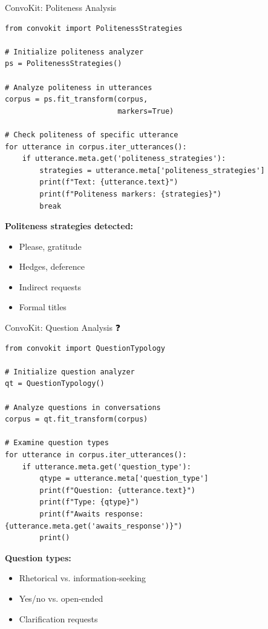 \documentclass[aspectratio=169]{beamer}
\begin{document}
\begin{frame}[fragile]{ConvoKit: Politeness Analysis 🎩}
    \begin{lstlisting}
from convokit import PolitenessStrategies

# Initialize politeness analyzer
ps = PolitenessStrategies()

# Analyze politeness in utterances
corpus = ps.fit_transform(corpus,
                          markers=True)

# Check politeness of specific utterance
for utterance in corpus.iter_utterances():
    if utterance.meta.get('politeness_strategies'):
        strategies = utterance.meta['politeness_strategies']
        print(f"Text: {utterance.text}")
        print(f"Politeness markers: {strategies}")
        break
    \end{lstlisting}

    \vspace{0.3cm}

    \textbf{Politeness strategies detected:}
    \begin{itemize}\setlength{\itemsep}{0pt}
        \item Please, gratitude
        \item Hedges, deference
        \item Indirect requests
        \item Formal titles
    \end{itemize}
\end{frame}

\begin{frame}[fragile]{ConvoKit: Question Analysis ❓}
    \begin{lstlisting}
from convokit import QuestionTypology

# Initialize question analyzer
qt = QuestionTypology()

# Analyze questions in conversations
corpus = qt.fit_transform(corpus)

# Examine question types
for utterance in corpus.iter_utterances():
    if utterance.meta.get('question_type'):
        qtype = utterance.meta['question_type']
        print(f"Question: {utterance.text}")
        print(f"Type: {qtype}")
        print(f"Awaits response: {utterance.meta.get('awaits_response')}")
        print()
    \end{lstlisting}

    \vspace{0.3cm}

    \textbf{Question types:}
    \begin{itemize}\setlength{\itemsep}{0pt}
        \item Rhetorical vs. information-seeking
        \item Yes/no vs. open-ended
        \item Clarification requests
    \end{itemize}
\end{frame}
\end{document}
